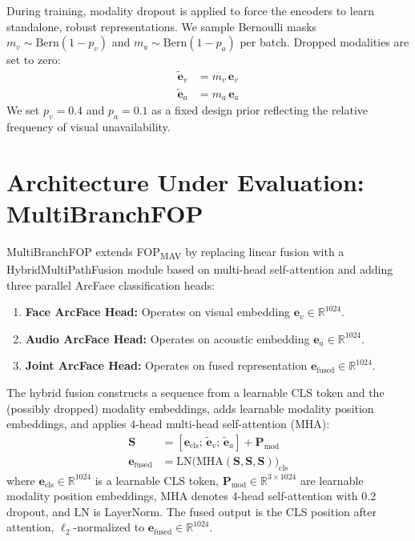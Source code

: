 \documentclass[conference]{IEEEtran}
\newcommand{\fopmav}{FOP\textsubscript{MAV}}
\begin{document}
During training, modality dropout is applied to force the encoders to learn
standalone, robust representations. We sample Bernoulli masks $m_v \sim \text{Bern}(1-p_v)$
and $m_a \sim \text{Bern}(1-p_a)$ per batch. Dropped modalities are set to zero:
\begin{align}
\tilde{\mathbf{e}}_v &= m_v\,\mathbf{e}_v \\
\tilde{\mathbf{e}}_a &= m_a\,\mathbf{e}_a
\end{align}
We set $p_v = 0.4$ and $p_a = 0.1$ as a fixed design prior reflecting the
relative frequency of visual unavailability.


\section{Architecture Under Evaluation: MultiBranchFOP}
\label{sec:architecture}

MultiBranchFOP extends \fopmav{} by replacing linear fusion with a
HybridMultiPathFusion module based on multi-head self-attention and adding
three parallel ArcFace classification heads:

\begin{enumerate}
    \item \textbf{Face ArcFace Head:} Operates on visual embedding $\mathbf{e}_v \in \mathbb{R}^{1024}$.
    \item \textbf{Audio ArcFace Head:} Operates on acoustic embedding $\mathbf{e}_a \in \mathbb{R}^{1024}$.
    \item \textbf{Joint ArcFace Head:} Operates on fused representation
    $\mathbf{e}_{\text{fused}} \in \mathbb{R}^{1024}$.
\end{enumerate}

The hybrid fusion constructs a sequence from a learnable CLS token and the
(possibly dropped) modality embeddings, adds learnable modality position
embeddings, and applies 4-head multi-head self-attention (MHA):
\begin{align}
\mathbf{S} &= [\mathbf{e}_{\text{cls}};\, \tilde{\mathbf{e}}_v;\, \tilde{\mathbf{e}}_a]
  + \mathbf{P}_{\text{mod}} \label{eq:fusion_seq} \\
\mathbf{e}_{\text{fused}} &= \text{LN}\bigl(\text{MHA}(\mathbf{S}, \mathbf{S}, \mathbf{S})\bigr)_{\text{cls}}
\label{eq:fusion}
\end{align}
where $\mathbf{e}_{\text{cls}} \in \mathbb{R}^{1024}$ is a learnable CLS token,
$\mathbf{P}_{\text{mod}} \in \mathbb{R}^{3 \times 1024}$ are learnable modality
position embeddings, $\text{MHA}$ denotes 4-head self-attention with 0.2 dropout,
and $\text{LN}$ is LayerNorm.
The fused output is the CLS position after attention,
$\ell_2$-normalized to $\mathbf{e}_{\text{fused}} \in \mathbb{R}^{1024}$.
\end{document}
